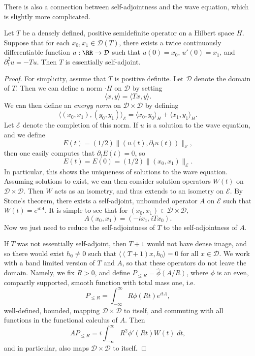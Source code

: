 There is also a connection between self-adjointness and the wave equation, which is slightly more complicated.

\begin{theorem}
    Let $T$ be a densely defined, positive semidefinite operator on a Hilbert space $H$. Suppose that for each $x_0,x_1 \in \mathcal{D}(T)$, there exists a twice continuously differentiable function $u: \RR \to \mathcal{D}$ such that $u(0) = x_0$, $u'(0) = x_1$, and $\partial_t^2 u = - T u$. Then $T$ is essentially self-adjoint.
\end{theorem}
\begin{proof}
    For simplicity, assume that $T$ is positive definite. Let $\mathcal{D}$ denote the domain of $T$. Then we can define a norm $\cdot{H}$ on $\mathcal{D}$ by setting
    \[ \langle x, y \rangle = \langle Tx, y \rangle. \]
    We can then define an \emph{energy norm} on $\mathcal{D} \times \mathcal{D}$ by defining
    \[ \langle (x_0,x_1), (y_0,y_1) \rangle_{\mathcal{E}} = \langle x_0,y_0 \rangle_{\dot{H}} + \langle x_1,y_1 \rangle_H. \]
    Let $\mathcal{E}$ denote the completion of this norm. If $u$ is a solution to the wave equation, and we define
    \[ E(t) = (1/2) \| (u(t), \partial_t u(t)) \|_{\mathcal{E}}, \]
    then one easily computes that $\partial_t E(t) = 0$, so
    \[ E(t) = E(0) = (1/2) \| (x_0,x_1) \|_{\mathcal{E}}. \]
    In particular, this shows the uniqueness of solutions to the wave equation. Assuming solutions to exist, we can then consider solution operators $W(t)$ on $\mathcal{D} \times \mathcal{D}$. Then $W$ acts as an isometry, and thus extends to an isometry on $\mathcal{E}$. By Stone's theorem, there exists a self-adjoint, unbounded operator $A$ on $\mathcal{E}$ such that $W(t) = e^{it A}$. It is simple to see that for $(x_0,x_1) \in \mathcal{D} \times \mathcal{D}$,
    \[ A(x_0,x_1) = (-i x_1, i T x_0). \]
    Now we just need to reduce the self-adjointness of $T$ to the self-adjointness of $A$.

    If $T$ was not essentially self-adjoint, then $T + 1$ would not have dense image, and so there would exist $h_0 \neq 0$ such that $\langle (T+1) x, h_0 \rangle = 0$  for all $x \in \mathcal{D}$. We work with a band limited version of $T$ and $A$, so that these operators do not leave the domain. Namely, we fix $R > 0$, and define $P_{\leq R} = \widehat{\phi}(A/R)$, where $\phi$ is an even, compactly supported, smooth function with total mass one, i.e.
    \[ P_{\leq R} = \int_{-\infty}^\infty R \phi(Rt) e^{itA}, \]
    well-defined, bounded, mapping $\mathcal{D} \times \mathcal{D}$ to itself, and commuting with all functions in the functional calculus of $A$. Then
    \[ AP_{\leq R} = i \int_{-\infty}^\infty R^2 \phi'(Rt) W(t)\; dt, \]
    and in particular, also maps $\mathcal{D} \times \mathcal{D}$ to itself.


\end{proof}
